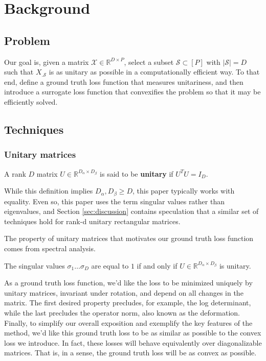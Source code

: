 \section{Background}

\subsection{Problem}

Our goal is, given a matrix $\mathcal X \in \mathbb R^{D \times P}$, select a subset $\mathcal S \subset [P]$ with $|\mathcal S| = D$ such that $X_{. \mathcal S}$ is as unitary as possible in a computationally efficient way.
To that end, define a ground truth loss function that measures unitariness, and then introduce a surrogate loss function that convexifies the problem so that it may be efficiently solved.

\subsection{Techniques}

\subsubsection{Unitary matrices}

\begin{definition}[Unitary]
A rank $D$ matrix $U \in \mathbb R^{D_\alpha \times D_\beta}$ is said to be \textbf{unitary} if $U^TU = I_D$.
\end{definition}

While this definition implies $D_\alpha, D_\beta \geq D$, this paper typically works with equality.
Even so, this paper uses the term singular values rather than eigenvalues, and Section \ref{sec:discussion} contains speculation that a similar set of techniques hold for rank-d unitary rectangular matrices.

The property of unitary matrices that motivates our ground truth loss function comes from spectral analysis.
\begin{proposition}
\label{prop:unitary_spectrum}
The singular values $\sigma_1 \dots \sigma_D$ are equal to $1$ if and only if $U \in \mathbb{R}^{D_\alpha \times D_\beta}$ is unitary.
\end{proposition}

As a ground truth loss function, we'd like the loss to be minimized uniquely by unitary matrices, invariant under rotation, and depend on all changes in the matrix.
The first desired property precludes, for example, the log determinant, while the last precludes the operator norm, also known as the deformation. %
Finally, to simplify our overall exposition and exemplify the key features of the method, we'd like this ground truth loss to be as similar as possible to the convex loss we introduce.
In fact, these losses will behave equivalently over diagonalizable matrices.
That is, in a sense, the ground truth loss will be as convex as possible.


